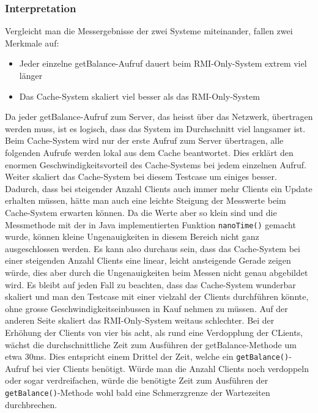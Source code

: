 \subsubsection{Interpretation}

Vergleicht man die Messergebnisse der zwei Systeme miteinander, fallen zwei Merkmale auf:
\begin{itemize}
\item Jeder einzelne getBalance-Aufruf dauert beim RMI-Only-System extrem viel länger
\item Das Cache-System skaliert viel besser als das RMI-Only-System
\end{itemize}

Da jeder getBalance-Aufruf zum Server, das heisst über das Netzwerk, übertragen werden muss, ist es logisch, dass das System im Durchschnitt viel langsamer ist. Beim Cache-System wird nur der erste Aufruf zum Server übertragen, alle folgenden Aufrufe werden lokal aus dem Cache beantwortet. Dies erklärt den enormen Geschwindigkeitsvorteil des Cache-Systems bei jedem einzelnen Aufruf. \newline
Weiter skaliert das Cache-System bei diesem Testcase um einiges besser. Dadurch, dass bei steigender Anzahl Clients auch immer mehr Clients ein Update erhalten müssen, hätte man auch eine leichte Steigung der Messwerte beim Cache-System erwarten können. Da die Werte aber so klein sind und die Messmethode mit der in Java implementierten Funktion \texttt{nanoTime()} gemacht wurde, können kleine Ungenauigkeiten in diesem Bereich nicht ganz ausgeschlossen werden. Es kann also durchaus sein, dass das Cache-System bei einer steigenden Anzahl Clients eine linear, leicht ansteigende Gerade zeigen würde, dies aber durch die Ungenauigkeiten beim Messen nicht genau abgebildet wird. Es bleibt auf jeden Fall zu beachten, dass das Cache-System wunderbar skaliert und man den Testcase mit einer vielzahl der Clients durchführen könnte, ohne grosse Geschwindigkeitseinbussen in Kauf nehmen zu müssen. \newline
Auf der anderen Seite skaliert das RMI-Only-System weitaus schlechter. Bei der Erhöhung der Clients von vier bis acht, als rund eine Verdopplung der CLients, wächst die durchschnittliche Zeit zum Ausführen der getBalance-Methode um etwa 30ms. Dies entspricht einem Drittel der Zeit, welche ein \texttt{getBalance()}-Aufruf bei vier Clients benötigt. Würde man die Anzahl Clients noch verdoppeln oder sogar verdreifachen, würde die benötigte Zeit zum Ausführen der \texttt{getBalance()}-Methode wohl bald eine Schmerzgrenze der Wartezeiten durchbrechen.


